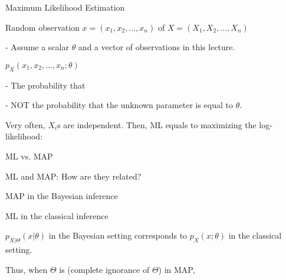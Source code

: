 \begin{frame}{Maximum Likelihood Estimation}

\plitemsep 0.1in

\bci
\item<2-> Random observation $x=(x_1, x_2, \ldots, x_n)$ of $X=(X_1, X_2, \ldots, X_n)$

- Assume a scalar $\theta$ and a vector of observations in this lecture.

\item<3-> 

\bci
\item $p_X(x_1, x_2, \ldots, x_n;\theta)$

- The probability that 

- NOT the probability that the unknown parameter is equal to $\theta.$




\item<5-> 



\eci

\item<6-> Very often, $X_i$s are independent. Then, ML equals to maximizing the log-likelihood:

\eci
\end{frame}

\begin{frame}{ML vs. MAP}

\plitemsep 0.1in

\bci
\item<1-> ML and MAP: How are they related?

\item<2-> MAP in the Bayesian inference

\item<3-> ML in the classical inference

\item<4-> $p_{X| \Theta}(x|\theta)$ in the Bayesian setting corresponds to $p_X(x;\theta)$ in the classical setting.

\item<5-> Thus, when $\Theta$ is  (complete ignorance of
  $\Theta$) in MAP, 

\eci
\end{frame}


